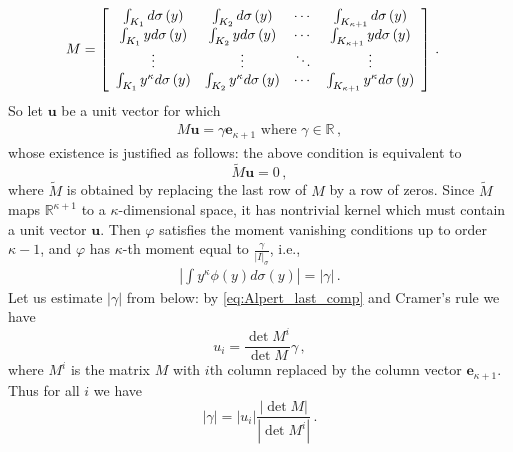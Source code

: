 \documentclass{amsart}%
\theoremstyle{plain}
\numberwithin{equation}{section}
\begin{document}
\begin{align*}
	M &  =\left[
\begin{array}
[c]{cccc}%
\int_{K_{1}}d\sigma\left(
y\right)   & \int_{K_{2}%
}d\sigma\left(  y\right)   & \cdots & \int_{K_{\kappa+1}}d\sigma\left(  y\right)  \\
\int_{K_{1}}yd\sigma\left(
y\right)   & \int_{K_{2}%
}yd\sigma\left(  y\right)   & \cdots & \int_{K_{\kappa+1}}yd\sigma\left(  y\right)  \\
\vdots & \vdots & \ddots & \vdots\\
\int_{K_{1}}y^{\kappa}%
d\sigma\left(  y\right)   & \int_{K_{2}}y^{\kappa}d\sigma\left(  y\right)   & \cdots & \int_{K_{\kappa+1}}%
y^{\kappa}d\sigma\left(  y\right)
\end{array}
\right] \, . 
\end{align*}
So let $\mathbf{u}$ be a unit vector for which 
\begin{align}\label{eq:Alpert_last_comp}
	M \mathbf{u} = \gamma \mathbf{e}_{\kappa+1} \text{ where } \gamma \in \mathbb{R} \, ,
\end{align}
whose existence is justified as follows: the above condition is equivalent to 
\[
	\widetilde{M} \mathbf{u} = 0 \, ,
\]
where $\widetilde{M}$ is obtained by replacing the last row of $M$ by a row of zeros. Since $\widetilde{M}$ maps $\mathbb{R}^{\kappa+1}$ to a $\kappa$-dimensional space, it has nontrivial kernel which must contain a unit vector $\mathbf{u}$. Then $\varphi$ satisfies the moment vanishing conditions up to order $\kappa-1$, and $\varphi$ has $\kappa$-th moment equal to $\frac{\gamma}{\left | I \right |_{\sigma}}$, i.e.,
\begin{align}\label{eq:phi_nondegen_moment}
	\left | \int y^{\kappa} \phi(y) d \sigma (y) \right | = \left | \gamma \right | \, . 
\end{align}
Let us estimate $\left | \gamma \right |$ from below: by \eqref{eq:Alpert_last_comp} and Cramer's rule we have
\[
	 u_i = \frac{\det M^i}{\det M} \gamma  \, ,
\]
where $M^i$ is the matrix $M$ with $i$th column replaced by the column vector $\mathbf{e}_{\kappa+1}$. Thus for all $i$ we have
\[
	\left | \gamma \right | = |u_i| \frac{ | \det M |}{ | \det M^i |  } \, .
\]
\end{document}
